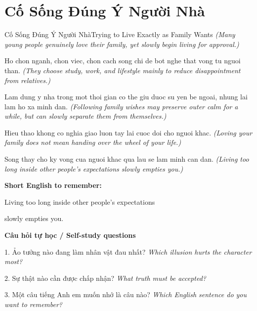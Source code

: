 \section{Cố Sống Đúng Ý Người Nhà}
\begin{truyen}{Cố Sống Đúng Ý Người Nhà}{Trying to Live Exactly as Family Wants}
\textit{(Many young people genuinely love their family, yet slowly begin living for approval.)}

Ho chon nganh, chon viec, chon cach song chi de bot nghe that vong tu nguoi than.
\textit{(They choose study, work, and lifestyle mainly to reduce disappointment from relatives.)}

Lam dung y nha trong mot thoi gian co the giu duoc su yen be ngoai, nhung lai lam ho xa minh dan.
\textit{(Following family wishes may preserve outer calm for a while, but can slowly separate them from themselves.)}

Hieu thao khong co nghia giao luon tay lai cuoc doi cho nguoi khac.
\textit{(Loving your family does not mean handing over the wheel of your life.)}

\end{truyen}

\begin{baihoc}
Song thay cho ky vong cua nguoi khac qua lau se lam minh can dan.
\textit{(Living too long inside other people’s expectations slowly empties you.)}
\end{baihoc}

\begin{ghinhoanh}
\textbf{Short English to remember:}

Living too long inside other people’s expectations

slowly empties you.

\end{ghinhoanh}

\begin{tuhocnhanh}
\textbf{Câu hỏi tự học / Self-study questions}

1. Ảo tưởng nào đang làm nhân vật đau nhất? \textit{Which illusion hurts the character most?}

2. Sự thật nào cần được chấp nhận? \textit{What truth must be accepted?}

3. Một câu tiếng Anh em muốn nhớ là câu nào? \textit{Which English sentence do you want to remember?}
\end{tuhocnhanh}
\ngancach

